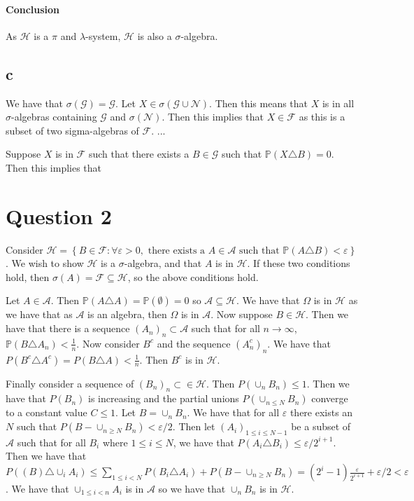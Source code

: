 \documentclass{article}
\theoremstyle{definition}
\numberwithin{theorem}{section}
\numberwithin{equation}{section}
\begin{document}
\paragraph{Conclusion}
As $\mathcal{H}$ is a $\pi$ and $\lambda$-system, $\mathcal{H}$ is also a $\sigma$-algebra. 

\subsection{c}
We have that $\sigma(\mathcal{G}) = \mathcal{G}$. 
Let $X \in \sigma(\mathcal{G} \cup \mathcal{N})$. Then this means that $X$ is in all $\sigma$-algebras containing $\mathcal{G}$ and $\sigma(\mathcal{N})$. Then this implies that $X \in \mathcal{F}$ as this is a subset of two sigma-algebras of $\mathcal{F}$. ...

Suppose $X$ is in $\mathcal{F}$ such that there exists a $B \in \mathcal{G}$ such that $\mathbb{P}(X \triangle B) = 0$. Then this implies that 


\section{Question 2}
Consider $\mathcal{H} = \left\{ B \in \mathcal{F}: \forall \varepsilon > 0, \text{ there exists a } A \in \mathcal{A} \text{ such that } \mathbb{P}(A \triangle B) < \varepsilon \right\}$. We wish to show $\mathcal{H}$ is a $\sigma$-algebra, and that $A$ is in $\mathcal{H}$. If these two conditions hold, then $\sigma(A) = \mathcal{F} \subseteq \mathcal{H}$, so the above conditions hold. 

Let $A \in \mathcal{A}$. Then $\mathbb{P}(A \triangle A) = \mathbb{P}(\emptyset) = 0$ so $\mathcal{A} \subseteq \mathcal{H}$.
We have that $\Omega$ is in $\mathcal{H}$ as we have that as $\mathcal{A}$ is an algebra, then $\Omega$ is in $\mathcal{A}$. Now suppose $B \in \mathcal{H}$. Then we have that there is a sequence $(A_n)_n \subset \mathcal{A}$ such that for all $n \rightarrow \infty$, $\mathbb{P}(B \triangle A_n) < \frac{1}{n}$. 
Now consider $B^c$ and the sequence $(A_n^c)_n$. We have that $P(B^c \triangle A^c) = P(B \triangle A) < \frac{1}{n}$. Then $B^c$ is in $\mathcal{H}$. 


Finally consider a sequence of $(B_n)_n \subset \in \mathcal{H}$. Then $P(\cup_n B_n) \leq 1$. Then we have that $P(B_n)$ is increasing and the partial unions $ P( \cup_{n \leq N} B_n)$ converge to a constant value $C \leq 1$. Let $B = \cup_n B_n$. We have that for all $\varepsilon$ there exists an $N$ such that $P(B - \cup_{n \geq N}B_n) < \varepsilon/2$. Then let $(A_i)_{1 \leq i \leq N - 1}$ be a subset of $\mathcal{A}$ such that for all $B_i$ where $1 \leq i \leq N$, we have that $P(A_i \triangle B_i) \leq \varepsilon/2^{i + 1}$. Then we have that $P((B) \triangle \cup_i A_i ) \leq \sum_{1 \leq i < N} P(B_i \triangle A_i) + P(B - \cup_{n \geq N}B_n) = (2^{i} - 1)\frac{\varepsilon}{2^{i + 1}} + \varepsilon/2 < \varepsilon$. We have that $\cup_{1 \leq i < n} A_i$ is in $\mathcal{A}$ so we have that $\cup_n B_n$ is in $\mathcal{H}$. 
\end{document}
